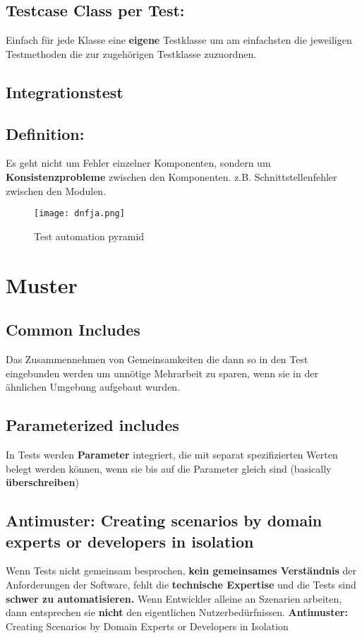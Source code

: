 \documentclass{book}
\begin{document}
    \subsection{Testcase Class per Test:}
    Einfach für jede Klasse eine \textbf{eigene} Testklasse um am einfachsten die jeweiligen Testmethoden die zur zugehörigen Testklasse zuzuordnen.
    \subsection{Integrationstest}
    \subsection{Definition:} Es geht nicht um Fehler einzelner Komponenten, sondern um
    \textbf{Konsistenzprobleme} zwischen den Komponenten. z.B. Schnittstellenfehler zwischen den Modulen.
    \begin{figure}[H]
        \centering
        \texttt{[image: dnfja.png]}
        \caption{Test automation pyramid}
        \label{fig:enter-label}
    \end{figure}
    \section{Muster}
    \subsection{Common Includes}
    Das Zusammennehmen von Gemeinsamkeiten die dann so in den Test eingebunden werden um unnötige Mehrarbeit zu sparen, wenn sie in der ähnlichen Umgebung aufgebaut wurden.
    \subsection{Parameterized includes}
    In Tests werden \textbf{Parameter} integriert, die mit separat spezifizierten Werten belegt werden können, wenn sie bis auf die Parameter gleich sind (basically \textbf{überschreiben})
    \subsection{Antimuster: Creating scenarios by domain experts or developers in isolation}
    Wenn Tests nicht gemeinsam besprochen, \textbf{kein gemeinsames Verständnis} der Anforderungen der Software, fehlt die \textbf{technische Expertise} und die Tests sind \textbf{schwer zu automatisieren.}
    \newline Wenn Entwickler alleine an
    Szenarien arbeiten, dann entsprechen sie \textbf{nicht} den eigentlichen
    Nutzerbedürfnissen.
    \textbf{Antimuster:} Creating Scenarios by
    Domain Experts or Developers in Isolation
\end{document}
